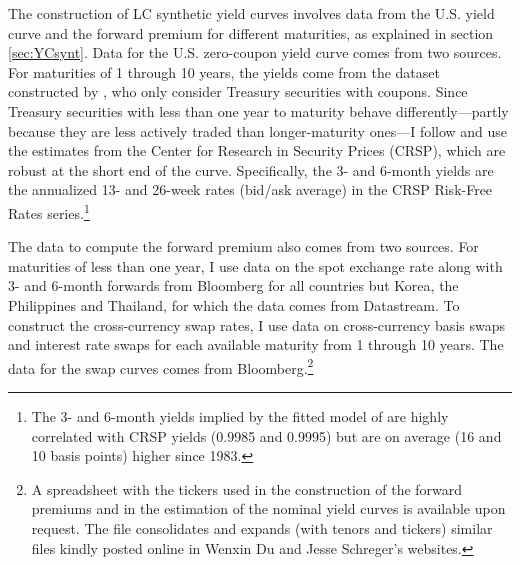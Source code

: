 {The construction of LC synthetic yield curves involves data from the U.S. yield curve and the forward premium for different maturities, as explained in section \ref{sec:YCsynt}. 
Data for the U.S. zero-coupon yield curve comes from two sources. 
For maturities of 1 through 10 years, the yields come from the dataset constructed by \cite{GSW:2007}, who only consider Treasury securities with coupons. %
Since Treasury securities with less than one year to maturity behave differently---partly because  
they are less actively traded than longer-maturity ones---I follow \cite{Duffee:2010} and use the estimates from the Center for Research in Security Prices (CRSP), which are %
robust at the short end of the curve.
Specifically, the 3- and 6-month yields are the annualized 13- and 26-week rates (bid/ask average) in the CRSP Risk-Free Rates series.\footnote{ The 3- and 6-month yields implied by the fitted model of \cite{GSW:2007} are highly correlated with CRSP yields (0.9985 and 0.9995) but are on average (16 and 10 basis points) higher since 1983.} %

The data to compute the forward premium also comes from two sources.
For maturities of less than one year, I use data on the spot exchange rate along with 3- and 6-month forwards from Bloomberg for all countries but Korea, the Philippines and Thailand, for which the data comes from Datastream.
To construct the cross-currency swap rates, I use data on cross-currency basis swaps and interest rate swaps for each available maturity from 1 through 10 years. 
The data for the swap curves comes from Bloomberg.\footnote{A spreadsheet with the tickers used in the construction of the forward premiums and in the estimation of the nominal yield curves is available upon request. The file consolidates and expands (with tenors and tickers) similar files kindly posted online in Wenxin Du and Jesse Schreger's websites.}

}
